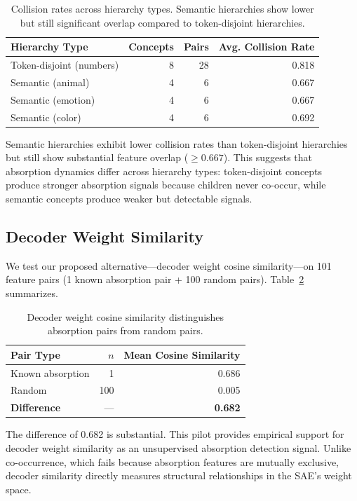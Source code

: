 \documentclass{article}
\begin{document}
\begin{table}[t]
\caption{Collision rates across hierarchy types. Semantic hierarchies show lower but still significant overlap compared to token-disjoint hierarchies.}
\label{tab:semantic}
\centering
\small
\begin{tabular}{lrrr}
\toprule
Hierarchy Type & Concepts & Pairs & Avg. Collision Rate \\
\midrule
Token-disjoint (numbers) & 8 & 28 & 0.818 \\
Semantic (animal) & 4 & 6 & 0.667 \\
Semantic (emotion) & 4 & 6 & 0.667 \\
Semantic (color) & 4 & 6 & 0.692 \\
\bottomrule
\end{tabular}
\end{table}

Semantic hierarchies exhibit lower collision rates than token-disjoint hierarchies but still show substantial feature overlap ($\geq 0.667$). This suggests that absorption dynamics differ across hierarchy types: token-disjoint concepts produce stronger absorption signals because children never co-occur, while semantic concepts produce weaker but detectable signals.

\subsection{Decoder Weight Similarity}

We test our proposed alternative---decoder weight cosine similarity---on 101 feature pairs (1 known absorption pair + 100 random pairs). Table~\ref{tab:decoder} summarizes.

\begin{table}[t]
\caption{Decoder weight cosine similarity distinguishes absorption pairs from random pairs.}
\label{tab:decoder}
\centering
\small
\begin{tabular}{lrr}
\toprule
Pair Type & $n$ & Mean Cosine Similarity \\
\midrule
Known absorption & 1 & 0.686 \\
Random & 100 & 0.005 \\
\textbf{Difference} & --- & \textbf{0.682} \\
\bottomrule
\end{tabular}
\end{table}

The difference of 0.682 is substantial. This pilot provides empirical support for decoder weight similarity as an unsupervised absorption detection signal. Unlike co-occurrence, which fails because absorption features are mutually exclusive, decoder similarity directly measures structural relationships in the SAE's weight space.
\end{document}
